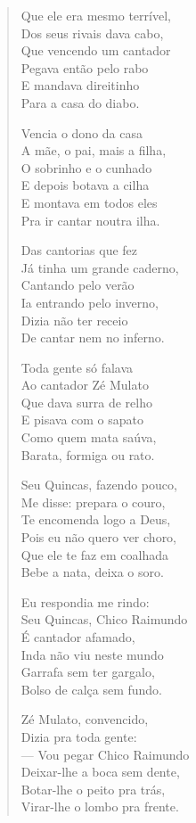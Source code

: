\begin{verse}
Que ele era mesmo terrível,\\
Dos seus rivais dava cabo,\\
Que vencendo um cantador\\
Pegava então pelo rabo\\
E mandava direitinho\\
Para a casa do diabo.

Vencia o dono da casa\\
A mãe, o pai, mais a filha,\\
O sobrinho e o cunhado\\
E depois botava a cilha\\
E montava em todos eles\\
Pra ir cantar noutra ilha.
\pagebreak

Das cantorias que fez\\
Já tinha um grande caderno,\\
Cantando pelo verão\\
Ia entrando pelo inverno,\\
Dizia não ter receio\\
De cantar nem no inferno.

Toda gente só falava\\
Ao cantador Zé Mulato\\
Que dava surra de relho\\
E pisava com o sapato\\
Como quem mata saúva,\\
Barata, formiga ou rato.

Seu Quincas, fazendo pouco,\\
Me disse: prepara o couro,\\
Te encomenda logo a Deus,\\
Pois eu não quero ver choro,\\
Que ele te faz em coalhada\\
Bebe a nata, deixa o soro.

Eu respondia me rindo:\\
Seu Quincas, Chico Raimundo\\
É cantador afamado,\\
Inda não viu neste mundo\\
Garrafa sem ter gargalo,\\
Bolso de calça sem fundo.
\pagebreak

Zé Mulato, convencido,\\
Dizia pra toda gente: \\
— Vou pegar Chico Raimundo\\
Deixar-lhe a boca sem dente,\\
Botar-lhe o peito pra trás,\\
Virar-lhe o lombo pra frente.


\end{verse}
